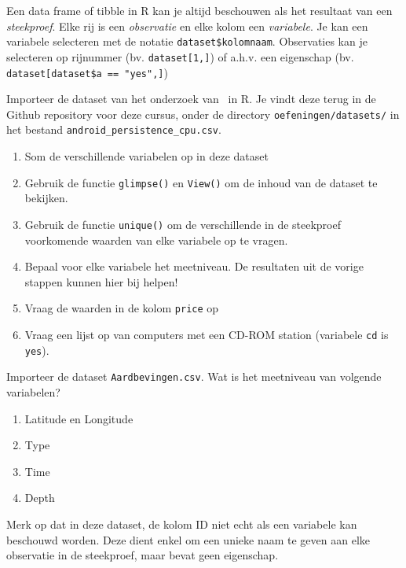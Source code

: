 Een data frame of tibble in R kan je altijd beschouwen als het resultaat van een \textit{steekproef}. Elke rij is een \textit{observatie} en elke kolom een \textit{variabele}. Je kan een variabele selecteren met de notatie \texttt{dataset\$kolomnaam}. Observaties kan je selecteren op rijnummer (bv. \texttt{dataset[1,]}) of a.h.v. een eigenschap (bv. \verb|dataset[dataset$a == "yes",]|)

\begin{exercise}
    Importeer de dataset van het onderzoek van~\textcite{Akin2016} in R. Je vindt deze terug in de Github repository voor deze cursus, onder de directory \texttt{oefeningen/datasets/} in het bestand \texttt{android\_persistence\_cpu.csv}.
    
    \begin{enumerate}
        \item Som de verschillende variabelen op in deze dataset
        \item Gebruik de functie \texttt{glimpse()} en \texttt{View()} om de inhoud van de dataset te bekijken.
        \item Gebruik de functie \texttt{unique()} om de verschillende in de steekproef voorkomende waarden van elke variabele op te vragen.
        \item Bepaal voor elke variabele het meetniveau. De resultaten uit de vorige stappen kunnen hier bij helpen!
        \item Vraag de waarden in de kolom \texttt{price} op
        \item Vraag een lijst op van computers met een CD-ROM station (variabele \texttt{cd} is \texttt{yes}).
    \end{enumerate}
\end{exercise}

\begin{exercise}
    Importeer de dataset \texttt{Aardbevingen.csv}. Wat is het meetniveau van volgende variabelen?
    
    \begin{enumerate}
        \item Latitude en Longitude
        \item Type
        \item Time
        \item Depth
    \end{enumerate}
    
    Merk op dat in deze dataset, de kolom ID niet echt als een variabele kan beschouwd worden. Deze dient enkel om een unieke naam te geven aan elke observatie in de steekproef, maar bevat geen eigenschap.
\end{exercise}

